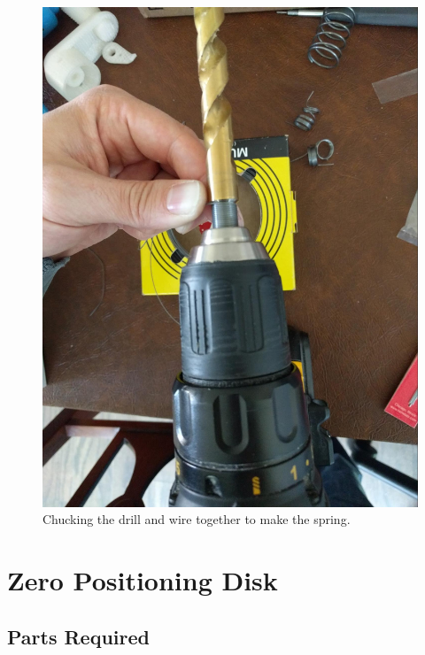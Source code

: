 \documentclass[openany]{book}
\begin{document}
\begin{figure}[!ht]
	\centering
	\includegraphics[width=.75\textwidth]{images/image26.jpg}
	\caption{Chucking the drill and wire together to make the spring.}
	\label{fig:image26}	
\end{figure}



\chapter{Zero Positioning Disk}
\section{Parts Required}
\end{document}
